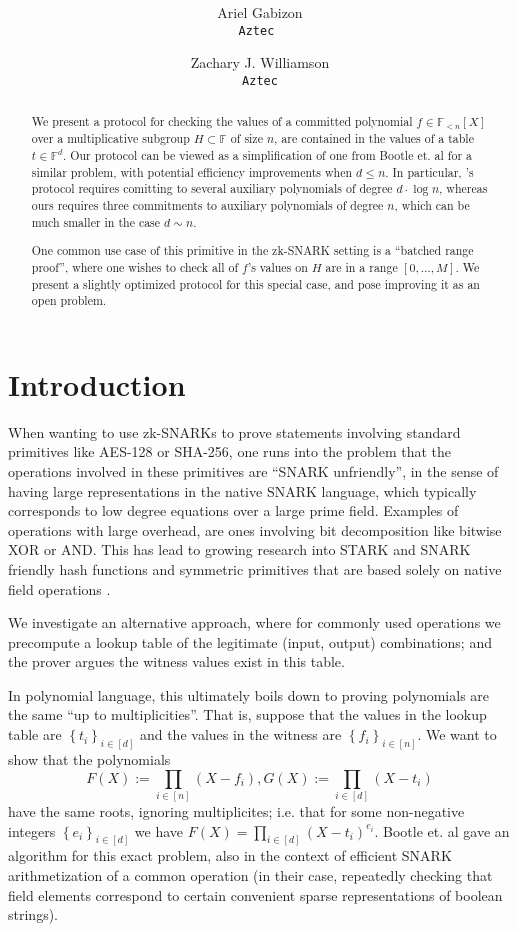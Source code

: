 \documentclass[11pt]{article} %
\title{ \bf \papertitle \\[0.72cm]}
\author{ Ariel Gabizon\\ \tt{Aztec}  \and Zachary J. Williamson\\ \tt{Aztec}}
\newcommand{\F}{\ensuremath{\mathbb F}\xspace}
\newcommand{\defeq}{:=}
\newcommand{\sett}[2]{\ensuremath{\set{#1}_{#2}}\xspace}
\newcommand{\set}[1]{\ensuremath{\left\{#1\right\}}\xspace}
\newcommand{\polysofdeg}[1]{\ensuremath{\F_{< #1}[X]}\xspace}
\begin{document}
    \maketitle

    
    \begin{abstract}
     We present a protocol for checking the values of a committed polynomial $f\in \polysofdeg{n}$ over a multiplicative subgroup $H\subset \F$ of size $n$, are contained in the values of a table $t\in \F^d$. Our protocol can be viewed as a simplification of one from Bootle et. al \cite{arya} for a similar problem, with potential efficiency improvements when $d\leq n$. In particular, \cite{arya}'s protocol requires comitting to several auxiliary polynomials of degree $d\cdot \log n$, whereas ours requires three commitments to auxiliary polynomials of degree $n$, which can be much smaller in the case $d\sim n$.
     
     One common use case of this primitive in the zk-SNARK setting is a ``batched range proof'', where one wishes to check all of $f$'s values on $H$ are in a range $[0,\ldots,M]$. We present a slightly optimized protocol for this special case, and pose improving it as an open problem.
    \end{abstract}


\section{Introduction}
When wanting to use zk-SNARKs to prove statements involving standard primitives like AES-128 or SHA-256, one runs into the problem that the operations involved in these primitives are ``SNARK unfriendly'', in the sense of having large representations in the native SNARK language, which typically corresponds to low degree equations over a large prime field.
Examples of operations with large overhead, are ones involving bit decomposition like bitwise XOR or AND. This has lead to growing research into STARK and SNARK friendly hash functions and symmetric primitives that are based solely on native field operations \cite{poseidon,marvelous,mimc,mimc2}.


We investigate an alternative approach, where for commonly used operations we precompute a lookup table of the legitimate (input, output) combinations; and the prover argues the witness values exist in this table.

In polynomial language, this ultimately boils down to proving polynomials are the same ``up to multiplicities''.
That is, suppose that the values in the lookup table are \sett{t_i}{i\in [d]} and the values in the witness are \sett{f_i}{i\in [n]}. We want to show that the polynomials
\[F(X)\defeq \prod_{i\in [n]} (X-f_i), G(X)\defeq \prod_{i\in [d]}(X-t_i)\]
have the same roots, ignoring multiplicites; i.e. that for some non-negative integers \sett{e_i}{i\in [d]} we  have
$F(X) = \prod_{i\in [d]} (X-t_i)^{e_i}$.
Bootle et. al \cite{arya} gave an algorithm for this exact problem, also in the context of efficient SNARK arithmetization of a common operation (in their case, repeatedly checking that field elements correspond to certain convenient sparse representations of boolean strings).
\end{document}

